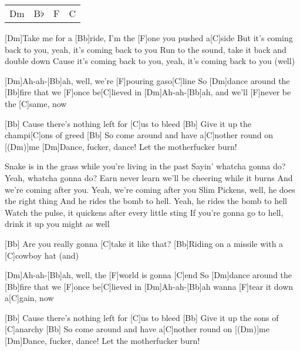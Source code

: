 

\begin{guitar}
	{\footnotesize\begin{tabular}{|l|l|l|l|}
			Dm & B$\flat$ & F & C
	\end{tabular} }
	
	[Dm]Take me for a [Bb]ride, I'm the [F]one you pushed a[C]side
	But it's coming back to you, yeah, it's coming back to you
	Run to the sound, take it back and double down
	Cause it's coming back to you, yeah, it's coming back to you (well)
	
	\begin{highlightbar}
		[Dm]Ah-ah-[Bb]ah, well, we're [F]pouring gaso[C]line
		So [Dm]dance around the [Bb]fire that we [F]once be[C]lieved in
		[Dm]Ah-ah-[Bb]ah, and we'll [F]never be the [C]same, now
		
		[Bb] Cause there's nothing left for [C]us to bleed
		[Bb] Give it up the champi[C]ons of greed
		[Bb] So come around and have a[C]nother round on [(Dm)]me
		[Dm]Dance, fucker, dance! Let the motherfucker burn!
	\end{highlightbar}
	
	\songsection{Verse 2}
	Snake is in the grass while you're living in the past
	Sayin' whatcha gonna do? Yeah, whatcha gonna do?
	Earn never learn we'll be cheering while it burns
	And we're coming after you. Yeah, we're coming after you
	Slim Pickens, well, he does the right thing
	And he rides the bomb to hell. Yeah, he rides the bomb to hell
	Watch the pulse, it quickens after every little sting
	If you're gonna go to hell, drink it up you might as well
	
	\songsection{Bridge}
	[Bb] Are you really gonna [C]take it like that?
	[Bb]Riding on a missile with a [C]cowboy hat (and)
	\pagebreak
	\begin{highlightbar}
		\songsection{Chorus}
		[Dm]Ah-ah-[Bb]ah, well, the [F]world is gonna [C]end
		So [Dm]dance around the [Bb]fire that we [F]once be[C]lieved in
		[Dm]Ah-ah-[Bb]ah wanna [F]tear it down a[C]gain, now
		
		[Bb] Cause there's nothing left for [C]us to bleed
		[Bb] Give it up the sons of [C]anarchy
		[Bb] So come around and have a[C]nother round on [(Dm)]me
		[Dm]Dance, fucker, dance! Let the motherfucker burn!
	\end{highlightbar}
	

\end{guitar}
